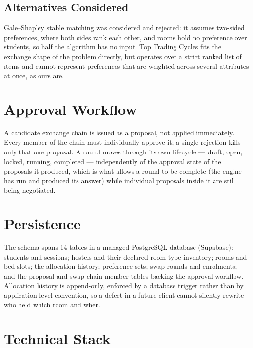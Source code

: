 \documentclass[11pt,a4paper]{report}
\begin{document}
\subsection{Alternatives Considered}

Gale--Shapley stable matching \autocite{gale1962college} was
considered and rejected: it assumes two-sided preferences, where both
sides rank each other, and rooms hold no preference over students, so
half the algorithm has no input. Top Trading Cycles
\autocite{shapley1974cores} fits the exchange shape of the problem
directly, but operates over a strict ranked list of items and cannot
represent preferences that are weighted across several attributes at
once, as ours are.

\section{Approval Workflow}

A candidate exchange chain is issued as a proposal, not applied
immediately. Every member of the chain must individually approve it;
a single rejection kills only that one proposal. A round moves through
its own lifecycle --- draft, open, locked, running, completed ---
independently of the approval state of the proposals it produced,
which is what allows a round to be complete (the engine has run and
produced its answer) while individual proposals inside it are still
being negotiated.

\section{Persistence}

The schema spans 14 tables in a managed PostgreSQL database
(Supabase): students and sessions; hostels and their declared
room-type inventory; rooms and bed slots; the allocation history;
preference sets; swap rounds and enrolments; and the proposal and
swap-chain-member tables backing the approval workflow. Allocation
history is append-only, enforced by a database trigger rather than by
application-level convention, so a defect in a future client cannot
silently rewrite who held which room and when.

\section{Technical Stack}
\end{document}
